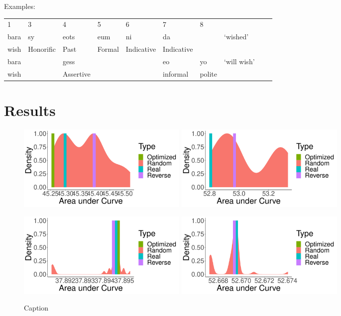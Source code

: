 \documentclass[11pt,letterpaper]{article}
\begin{document}
Examples:
\begin{tabular}{llllllllll}
1    & 3 & 4     & 5   & 6  & 7 & 8 \\
bara & sy & eots & eum & ni & da  & &  `wished'\\
wish & Honorific & Past & Formal & Indicative & Indicative \\
bara& & gess &  & &  eo & yo  &  `will wish' \\
wish  & &  Assertive && & informal & polite \\
\end{tabular}


\section{Results}


\begin{figure}
    \centering
    \includegraphics[width=0.4\textwidth]{figures/Hungarian-suffixes-byMorphemes-auc-hist-heldout-Coarse-FineSurprisal-optimized.pdf}
    \includegraphics[width=0.4\textwidth]{figures/Hungarian-suffixes-byMorphemes-auc-hist-heldout-Nouns-Coarse-FineSurprisal-optimized.pdf}
    
    \includegraphics[width=0.4\textwidth]{figures/Turkish-suffixes-byMorphemes-auc-hist-heldout-Coarse-FineSurprisal-optimized.pdf}
    \includegraphics[width=0.4\textwidth]{figures/Turkish-suffixes-byMorphemes-auc-hist-heldout-Nouns-Coarse-FineSurprisal-optimized.pdf}
    \caption{Caption}
    \label{fig:my-label}
\end{figure}
\end{document}

